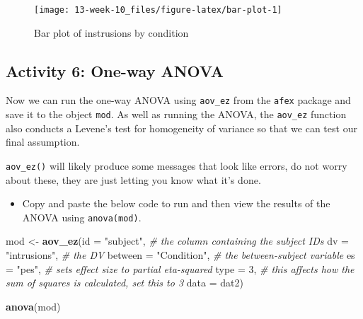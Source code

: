 \documentclass[]{book}
\newenvironment{Shaded}{\begin{snugshade}}{\end{snugshade}}
\newcommand{\CommentTok}[1]{\textcolor[rgb]{0.56,0.35,0.01}{\textit{#1}}}
\newcommand{\DataTypeTok}[1]{\textcolor[rgb]{0.13,0.29,0.53}{#1}}
\newcommand{\DecValTok}[1]{\textcolor[rgb]{0.00,0.00,0.81}{#1}}
\newcommand{\KeywordTok}[1]{\textcolor[rgb]{0.13,0.29,0.53}{\textbf{#1}}}
\newcommand{\NormalTok}[1]{#1}
\newcommand{\StringTok}[1]{\textcolor[rgb]{0.31,0.60,0.02}{#1}}
\providecommand{\tightlist}{%
  \setlength{\itemsep}{0pt}\setlength{\parskip}{0pt}}
\begin{document}
\begin{figure}

{\centering \texttt{[image: 13-week-10\_files/figure-latex/bar-plot-1]} 

}

\caption{Bar plot of instrusions by condition}\label{fig:bar-plot}
\end{figure}

\hypertarget{activity-6-one-way-anova}{%
\subsection{Activity 6: One-way ANOVA}\label{activity-6-one-way-anova}}

Now we can run the one-way ANOVA using \texttt{aov\_ez} from the \texttt{afex} package and save it to the object \texttt{mod}. As well as running the ANOVA, the \texttt{aov\_ez} function also conducts a Levene's test for homogeneity of variance so that we can test our final assumption.

\texttt{aov\_ez()} will likely produce some messages that look like errors, do not worry about these, they are just letting you know what it's done.

\begin{itemize}
\tightlist
\item
  Copy and paste the below code to run and then view the results of the ANOVA using \texttt{anova(mod)}.
\end{itemize}

\begin{Shaded}
\begin{Highlighting}[]
\NormalTok{mod <-}\StringTok{ }\KeywordTok{aov_ez}\NormalTok{(}\DataTypeTok{id =} \StringTok{"subject"}\NormalTok{, }\CommentTok{# the column containing the subject IDs}
              \DataTypeTok{dv =} \StringTok{"intrusions"}\NormalTok{, }\CommentTok{# the DV }
              \DataTypeTok{between =} \StringTok{"Condition"}\NormalTok{, }\CommentTok{# the between-subject variable}
              \DataTypeTok{es =} \StringTok{"pes"}\NormalTok{, }\CommentTok{# sets effect size to partial eta-squared}
              \DataTypeTok{type =} \DecValTok{3}\NormalTok{, }\CommentTok{# this affects how the sum of squares is calculated, set this to 3}
              \DataTypeTok{data =}\NormalTok{ dat2)}

\KeywordTok{anova}\NormalTok{(mod)}
\end{Highlighting}
\end{Shaded}
\end{document}
